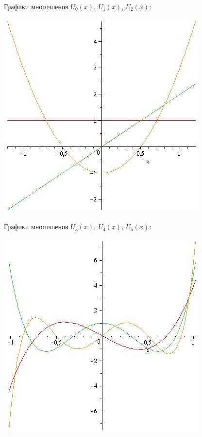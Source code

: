 \documentclass[12pt]{article}
\theoremstyle{definition}
\numberwithin{equation}{section}
\begin{document}
Графики многочленов $U_0(x),~ U_1(x),~ U_2(x)$:\begin{center}
\includegraphics[scale=0.5]{U0U1U2.jpg} \end{center}
Графики многочленов $U_3(x),~ U_4(x),~ U_5(x)$:\begin{center}
\includegraphics[scale=0.5]{U3U4U5.jpg} \end{center}	
\end{document}
